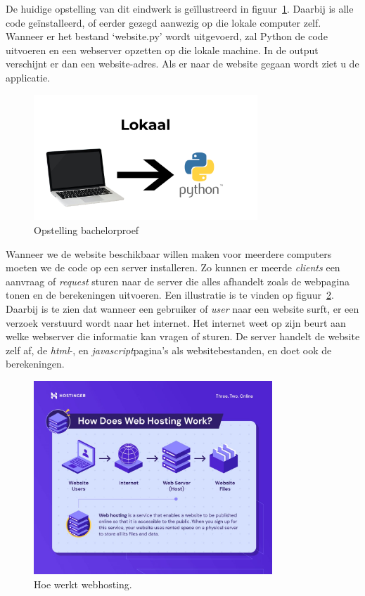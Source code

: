 De huidige opstelling van dit eindwerk is geïllustreerd in figuur~\ref{fig:opstelling_bachelorproef}. Daarbij is alle code geïnstalleerd, of eerder gezegd aanwezig op die lokale computer zelf. Wanneer er het bestand `website.py' wordt uitgevoerd, zal Python de code uitvoeren en een webserver opzetten op die lokale machine. In de output verschijnt er dan een website-adres. Als er naar de website gegaan wordt ziet u de applicatie.

\begin{figure}
    \centering
    \includegraphics[width=0.75\textwidth]{./img/lokaal_website}
    \caption{\label{fig:opstelling_bachelorproef} Opstelling bachelorproef}
\end{figure}

Wanneer we de website beschikbaar willen maken voor meerdere computers moeten we de code op een server installeren. Zo kunnen er meerde \textit{clients} een aanvraag of \textit{request} sturen naar de server die alles afhandelt zoals de webpagina tonen en de berekeningen uitvoeren. Een illustratie is te vinden op figuur~\ref{fig:webhosting_scheme}. Daarbij is te zien dat wanneer een gebruiker of \textit{user} naar een website surft, er een verzoek verstuurd wordt naar het internet. Het internet weet op zijn beurt aan welke webserver die informatie kan vragen of sturen. De server handelt de website zelf af, de \textit{html}-, en \textit{javascript}pagina's als websitebestanden, en doet ook de berekeningen.

\begin{figure}
    \centering
    \includegraphics[width=0.8\textwidth]{./img/how-does-web-hosting-work}
    \caption{\label{fig:webhosting_scheme} Hoe werkt webhosting.~\autocite{Tamara2022}}
\end{figure}

